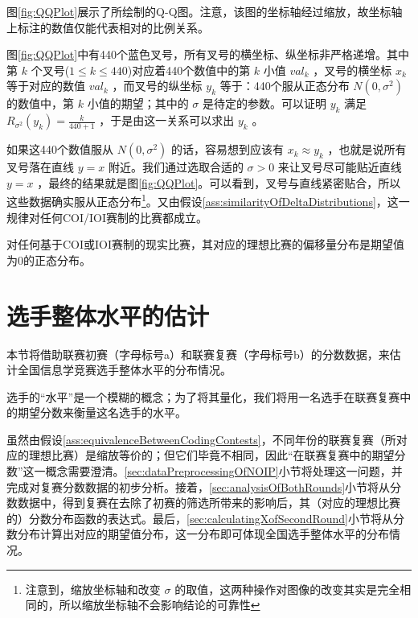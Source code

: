         \vspace{1.5ex}

        图\ref{fig:QQPlot}展示了所绘制的Q-Q图。注意，该图的坐标轴经过缩放，故坐标轴上标注的数值仅能代表相对的比例关系。
        
        图\ref{fig:QQPlot}中有440个蓝色叉号，所有叉号的横坐标、纵坐标非严格递增。其中第 $k$ 个叉号($1\leq k\leq 440$)对应着440个数值中的第 $k$ 小值 $\textit{val}_k$ ，叉号的横坐标 $x_k$ 等于对应的数值 $\textit{val}_k$ ，而叉号的纵坐标 $y_k$ 等于：440个服从正态分布 $N(0,\sigma^2)$ 的数值中，第 $k$ 小值的期望；其中的 $\sigma$ 是待定的参数。可以证明 $y_k$ 满足 $R_{\sigma^2}(y_k)=\frac {k}{440+1}$ ，于是由这一关系可以求出 $y_k$ 。

        如果这440个数值服从 $N(0,\sigma^2)$ 的话，容易想到应该有 $x_k\approx y_k$ ，也就是说所有叉号落在直线 $y=x$ 附近。我们通过选取合适的 $\sigma>0$ 来让叉号尽可能贴近直线 $y=x$ ，最终的结果就是图\ref{fig:QQPlot}。可以看到，叉号与直线紧密贴合，所以这些数据确实服从正态分布\footnote{注意到，缩放坐标轴和改变 $\sigma$ 的取值，这两种操作对图像的改变其实是完全相同的，所以缩放坐标轴不会影响结论的可靠性}。又由假设\ref{ass:similarityOfDeltaDistributions}，这一规律对任何COI/IOI赛制的比赛都成立。

        \begin{theorem}[偏移量分布的形式]
            对任何基于COI或IOI赛制的现实比赛，其对应的理想比赛的偏移量分布是期望值为$0$的正态分布。
            \label{thm:normalityOfOffsetsDistribution}
        \end{theorem}

\section{选手整体水平的估计}\label{sec:estimationOfOverallDistribution}

    本节将借助联赛初赛（字母标号a）和联赛复赛（字母标号b）的分数数据，来估计全国信息学竞赛选手整体水平的分布情况。

    选手的“水平”是一个模糊的概念；为了将其量化，我们将用一名选手在联赛复赛中的期望分数来衡量这名选手的水平。

    虽然由假设\ref{ass:equivalenceBetweenCodingContests}，不同年份的联赛复赛（所对应的理想比赛）是缩放等价的；但它们毕竟不相同，因此“在联赛复赛中的期望分数”这一概念需要澄清。\ref{sec:dataPreprocessingOfNOIP}小节将处理这一问题，并完成对复赛分数数据的初步分析。接着，\ref{sec:analysisOfBothRounds}小节将从分数数据中，得到复赛在去除了初赛的筛选所带来的影响后，其（对应的理想比赛的）分数分布函数的表达式。最后，\ref{sec:calculatingXofSecondRound}小节将从分数分布计算出对应的期望值分布，这一分布即可体现全国选手整体水平的分布情况。

